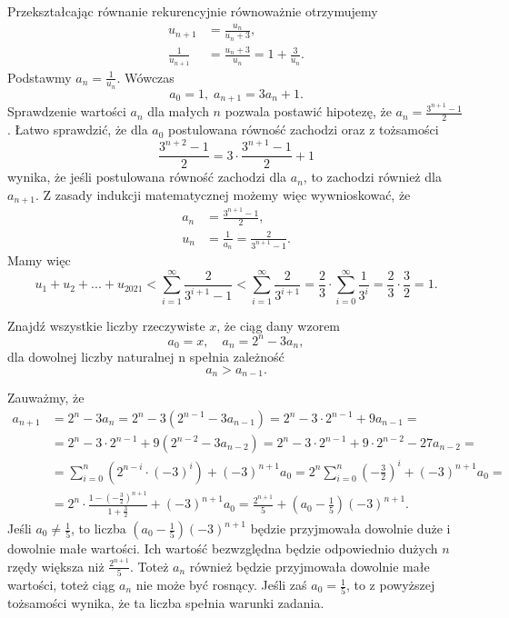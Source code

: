 \noindent
Przekształcając równanie rekurencyjnie równoważnie otrzymujemy
\begin{align*}
	u_{n + 1} &= \frac{u_n}{u_n + 3}, \\
	\frac{1}{u_{n + 1}} &= \frac{u_n + 3}{u_n} = 1 + \frac{3}{u_n}.
\end{align*}
Podstawmy $a_n = \frac{1}{u_n}$. Wówczas
\[
	a_0 = 1, \; a_{n + 1} = 3a_n + 1. 
\]
Sprawdzenie wartości $a_n$ dla małych $n$ pozwala postawić hipotezę, że $a_n = \frac{3^{n + 1} - 1}{2}$. Łatwo sprawdzić, że dla $a_0$ postulowana równość zachodzi oraz z tożsamości
\[
	\frac{3^{n + 2} - 1}{2} = 3 \cdot \frac{3^{n + 1} - 1}{2} + 1
\]
wynika, że jeśli postulowana równość zachodzi dla $a_n$, to zachodzi również dla $a_{n + 1}$. Z zasady indukcji matematycznej możemy więc wywnioskować, że
\begin{align*}
	a_{n} &= \frac{3^{n + 1} - 1}{2}, \\
	u_n &= \frac{1}{a_n} = \frac{2}{3^{n + 1} - 1}.
\end{align*}
Mamy więc
\[
	u_1 + u_2 + ... + u_{2021} < \sum^{\infty}_{i = 1} \frac{2}{3^{i + 1} - 1} < \sum^{\infty}_{i = 1} \frac{2}{3^{i + 1}} = \frac{2}{3} \cdot \sum^{\infty}_{i = 0} \frac{1}{3^{i}} = \frac{2}{3} \cdot \frac{3}{2} = 1.
\]

\begin{problem}{4}
	Znajdź wszystkie liczby rzeczywiste $x$, że ciąg dany wzorem
	\[
		a_0 = x, \quad a_n = 2^n - 3a_n,
	\]
	dla dowolnej liczby naturalnej n spełnia zależność
	\[
		a_{n} > a_{n - 1}.
	\]
\end{problem}

\noindent
Zauważmy, że
\begin{align*}
	a_{n + 1} &= 2^n - 3a_n = 2^n - 3(2^{n - 1} - 3a_{n - 1}) = 2^n - 3 \cdot 2^{n - 1} + 9a_{n - 1} =  \\
	&= 2^n - 3 \cdot 2^{n - 1} + 9(2^{n - 2} - 3a_{n - 2}) = 2^n - 3 \cdot 2^{n - 1} + 9 \cdot 2^{n - 2} - 27a_{n - 2} = \\
	&= \sum^{n}_{i = 0} \left(2^{n - i} \cdot (-3)^i\right) + (-3)^{n + 1}a_0 = 2^n \sum^{n}_{i = 0} \left(-\frac{3}{2}\right)^i + (-3)^{n + 1}a_0 = \\
	&= 2^n \cdot \frac{1 - \left(-\frac{3}{2}\right)^{n + 1}}{1 + \frac{3}{2}} + (-3)^{n + 1}a_0 = \frac{2^{n + 1}}{5} +\left(a_0 - \frac{1}{5}\right)(-3)^{n + 1}.
\end{align*}
Jeśli $a_0 \neq \frac{1}{5}$, to liczba $\left(a_0 - \frac{1}{5}\right)(-3)^{n + 1}$ będzie przyjmowała dowolnie duże i dowolnie małe wartości. Ich wartość bezwzględna będzie odpowiednio dużych $n$ rzędy większa niż $\frac{2^{n + 1}}{5}$. Toteż $a_n$ również będzie przyjmowała dowolnie małe wartości, toteż ciąg $a_n$ nie może być rosnący. Jeśli zaś $a_0 = \frac{1}{5}$, to z powyższej tożsamości wynika, że ta liczba spełnia warunki zadania.

